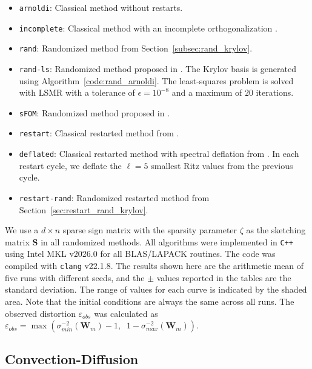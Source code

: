 \documentclass[smallextended]{svjour3}
\newcommand{\mat}[1]{\mathbf{#1}}
\begin{document}
\begin{itemize}
  \item \texttt{arnoldi}: Classical method without restarts.
  \item \texttt{incomplete}: Classical method with an incomplete orthogonalization \cite{saad_iterative_2003}.
  \item \texttt{rand}: Randomized method from Section~\ref{subsec:rand_krylov}.
  \item \texttt{rand-ls}: Randomized method proposed in \cite[Algorithm 3.1]{cortinovis_speeding_2024}. The Krylov basis is generated using Algorithm~\ref{code:rand_arnoldi}. The least-squares problem is solved with LSMR \cite{fong_lsmr_2011} with a tolerance of $\epsilon = 10^{-8}$ and a maximum of $20$ iterations.
  \item \texttt{sFOM}: Randomized method proposed in \cite{guttel_randomized_2023,palitta_sketched_2025}.
  \item \texttt{restart}: Classical restarted method from \cite{afanasjew_implementation_2008,eiermann_restarted_2006,guttel_limited-memory_2020}.
  \item \texttt{deflated}: Classical restarted method with spectral deflation from \cite{eiermann_deflated_2011}. In each restart cycle, we deflate the $\ell=5$ smallest Ritz values from the previous cycle.
  \item \texttt{restart-rand}: Randomized restarted method from Section~\ref{sec:restart_rand_krylov}.
\end{itemize}

We use a $d \times n$ sparse sign matrix with the sparsity parameter $\zeta$ as the sketching matrix $\mat{S}$ in all randomized methods. All algorithms were implemented in \texttt{C++} using Intel MKL v2026.0 for all BLAS/LAPACK routines. The code was compiled with \texttt{clang} v22.1.8. The results shown here are the arithmetic mean of five runs with different seeds, and the $\pm$ values reported in the tables are the standard deviation. The range of values for each curve is indicated by the shaded area. Note that the initial conditions are always the same across all runs. The observed distortion $\varepsilon_{obs}$ was calculated as $\varepsilon_{obs} = \max\left( \sigma_{min}^{-2}(\mat{W}_m) - 1,\;\; 1 - \sigma_{max}^{-2}(\mat{W}_m) \right)$.

\subsection{Convection-Diffusion}
\label{subsec:conv_diff}
\end{document}

